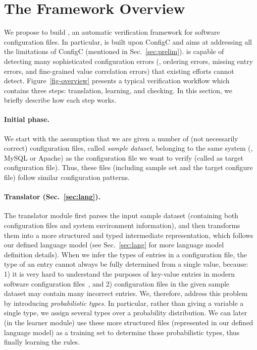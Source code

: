 
\section{The \app Framework Overview}
\label{sec:overview}

We propose to build \app, an automatic verification framework for 
software configuration files.
In particular, \app is built upon ConfigC and aims at addressing
all the limitations of ConfigC (mentioned in Sec.~\ref{sec:prelim}).
\app is capable of detecting many sophisticated 
configuration errors (\eg, ordering errors, missing entry errors,
and fine-grained value correlation errors) that existing
efforts cannot detect. 
Figure~\ref{fig-overview} presents
a typical \app verification workflow which contains three steps:
translation, learning, and checking. In this section, we briefly
describe how each step works.

\paragraph{Initial phase.}
We start with the assumption 
that we are given a number of (not necessarily correct) 
configuration files, called {\em sample dataset}, 
belonging to the same system (\eg, MySQL or Apache)
as the configuration file we want to verify (called as target
configuration file). Thus, these files (including sample set
and the target configure file) follow similar configuration patterns.

\paragraph{Translator (Sec.~\ref{sec:lang}).}
The translator module first parses the input sample dataset 
(containing both configuration files and system environment
information), and then transforms them into a more structured
and typed intermediate representation, which follows
our defined language model (see Sec.~\ref{sec:lang} 
for more language model definition details).
When we infer the types of entries in a configuration file, 
the type of an entry cannot always be fully determined from 
a single value, because: 1) it is very hard to understand
the purposes of key-value entries in modern
software configuration files~\cite{xu15hey},
and 2) configuration files in the given sample dataset may contain 
many incorrect entries.
We, therefore, address this problem 
by introducing {\em probabilistic types}.
In particular, rather than giving a variable a single type, 
we assign several types over a probability distribution. 
We can later (in the learner module) use these more structured files
(represented in our defined language model) 
as a training set to determine those probabilistic types, 
thus finally learning the rules. 

